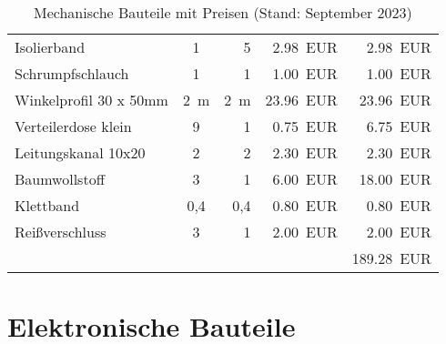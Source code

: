 \documentclass[./00PhotoBox.tex]{subfiles}
\begin{document}
\begin{table}[ht]
\begin{tabular}{l|c|r|r|r}
        Isolierband                   & 1                & 5                & \SI{2,98}{EUR}       & \SI{2,98}{EUR}   \\
        Schrumpfschlauch              & 1                & 1                & \SI{1,00}{EUR}       & \SI{1,00}{EUR}   \\
        Winkelprofil 30 x 50mm        & \SI{2}{\metre}   & \SI{2}{\metre}   & \SI{23,96}{EUR}      & \SI{23,96}{EUR}  \\
        Verteilerdose klein           & 9                & 1                & \SI{0,75}{EUR}       & \SI{6,75}{EUR}   \\
        Leitungskanal 10x20           & 2                & 2                & \SI{2,30}{EUR}       & \SI{2,30}{EUR}   \\
        Baumwollstoff                 & 3                & 1                & \SI{6,00}{EUR}       & \SI{18,00}{EUR}  \\
        Klettband                     & 0,4              & 0,4              & \SI{0,80}{EUR}       & \SI{0,80}{EUR}   \\
        Reißverschluss                & 3                & 1                & \SI{2,00}{EUR}       & \SI{2,00}{EUR}   \\
                                      &                  &                  &                      & \SI{189,28}{EUR} \\
    \end{tabular}
    \caption{Mechanische Bauteile mit Preisen (Stand: September 2023)}
    \label{tab:bauteile_mechanisch}
\end{table}

\clearpage

\section{Elektronische Bauteile}
\end{document}
